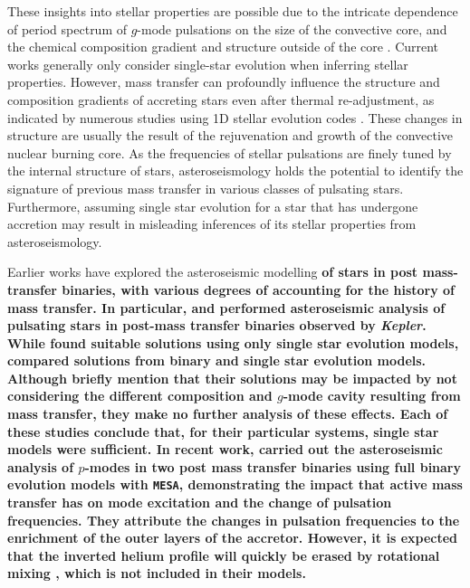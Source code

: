 \documentclass[twocolumn, twocolappendix, oneside]{aastex631}
\newcommand{\gmode}{$g$-mode\xspace}
\newcommand{\mesa}{\texttt{MESA}\xspace}
\begin{document}
These insights into stellar properties are possible due to the intricate dependence of period spectrum of \gmode pulsations on the size of the convective core, and the chemical composition gradient and structure outside of the core \citep[e.g.][]{Dziembowski1993,Miglio+2008,Hatta+2023}. Current works generally only consider single-star evolution when inferring stellar properties. However, mass transfer can profoundly influence the structure and composition gradients of accreting stars even after thermal re-adjustment, as indicated by numerous studies using 1D stellar evolution codes \citep{Braun+1995,Renzo+2021,Miszuda+2021}. These changes in structure are usually the result of the rejuvenation and growth of the convective nuclear burning core. As the frequencies of stellar pulsations are finely tuned by the internal structure of stars, asteroseismology holds the potential to identify the signature of previous mass transfer in various classes of pulsating stars. Furthermore, assuming single star evolution for a star that has undergone accretion may result in misleading inferences of its stellar properties from asteroseismology.

Earlier works have explored the asteroseismic modelling {\bf of stars in post mass-transfer binaries, with various degrees of accounting for the history of mass transfer. In particular, \citet{Guo+2017:2017ApJ...837..114G,Guo2017b} and \citet{Chen2021} performed asteroseismic analysis of pulsating stars in post-mass transfer binaries observed by {\it Kepler}. While \citet{Guo+2017:2017ApJ...837..114G,Guo2017b} found suitable solutions using only single star evolution models, \citet{Chen2021} compared solutions from binary and single star evolution models. Although \citet{Guo+2017:2017ApJ...837..114G} briefly mention that their solutions may be impacted by not considering the different composition and \gmode cavity resulting from mass transfer, they make no further analysis of these effects. Each of these studies conclude that, for their particular systems, single star models were sufficient. In recent work, \citet{Miszuda+2021,Miszuda+2022:2022MNRAS.514..622M} carried out the asteroseismic analysis of $p$-modes in two post mass transfer binaries using full binary evolution models with \mesa, demonstrating the impact that active mass transfer has on mode excitation and the change of pulsation frequencies. 
They attribute the changes in pulsation frequencies to the enrichment of the outer layers of the accretor. However, it is expected that the inverted helium profile will quickly be erased by rotational mixing \citep[e.g.][]{Packet+1981, Renzo+2021}, which is not included in their models. 
}
\end{document}
